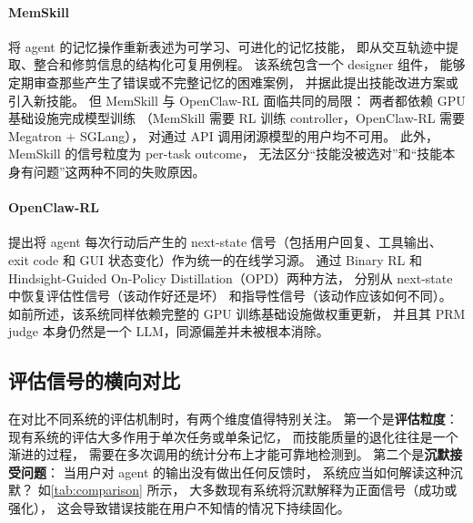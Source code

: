 \documentclass[12pt,a4paper]{article}
\begin{document}
	\paragraph{MemSkill~\cite{memskill}}
	将 agent 的记忆操作重新表述为可学习、可进化的记忆技能，
	即从交互轨迹中提取、整合和修剪信息的结构化可复用例程。
	该系统包含一个 designer 组件，
	能够定期审查那些产生了错误或不完整记忆的困难案例，
	并据此提出技能改进方案或引入新技能。
	但 MemSkill 与 OpenClaw-RL 面临共同的局限：
	两者都依赖 GPU 基础设施完成模型训练
	（MemSkill 需要 RL 训练 controller，OpenClaw-RL 需要 Megatron + SGLang），
	对通过 API 调用闭源模型的用户均不可用。
	此外，MemSkill 的信号粒度为 per-task outcome，
	无法区分``技能没被选对''和``技能本身有问题''这两种不同的失败原因。
	
	\paragraph{OpenClaw-RL~\cite{openclaw_rl}}
	提出将 agent 每次行动后产生的 next-state 信号（包括用户回复、工具输出、
	exit code 和 GUI 状态变化）作为统一的在线学习源。
	通过 Binary RL 和 Hindsight-Guided On-Policy Distillation（OPD）两种方法，
	分别从 next-state 中恢复评估性信号（该动作好还是坏）
	和指导性信号（该动作应该如何不同）。
	如前所述，该系统同样依赖完整的 GPU 训练基础设施做权重更新，
	并且其 PRM judge 本身仍然是一个 LLM，同源偏差并未被根本消除。
	
	\subsection{评估信号的横向对比}
	
	在对比不同系统的评估机制时，有两个维度值得特别关注。
	第一个是\textbf{评估粒度}：
	现有系统的评估大多作用于单次任务或单条记忆，
	而技能质量的退化往往是一个渐进的过程，
	需要在多次调用的统计分布上才能可靠地检测到。
	第二个是\textbf{沉默接受问题}：
	当用户对 agent 的输出没有做出任何反馈时，
	系统应当如何解读这种沉默？
	如\cref{tab:comparison} 所示，
	大多数现有系统将沉默解释为正面信号（成功或强化），
	这会导致错误技能在用户不知情的情况下持续固化。
	
\end{document}
